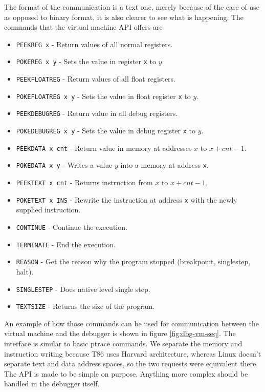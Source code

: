 The format of the communication is a text one, merely because of the ease
of use as opposed to binary format, it is also clearer to see what is
happening. The commands that the virtual machine API offers are
\begin{itemize}
    \item \texttt{PEEKREG x} - Return values of all normal registers.
    \item \texttt{POKEREG x y} - Sets the value in register \texttt{x} to
        $y$.
    \item \texttt{PEEKFLOATREG} - Return values of all float registers.
    \item \texttt{POKEFLOATREG x y} - Sets the value in float register
        \texttt{x} to $y$.
    \item \texttt{PEEKDEBUGREG} - Return value in all debug registers.
    \item \texttt{POKEDEBUGREG x y} - Sets the value in debug register
        \texttt{x} to $y$.
    \item \texttt{PEEKDATA x cnt} - Return value in memory at addresses $x$ to $x + cnt - 1$.
    \item \texttt{POKEDATA x y} - Writes a value $y$ into a memory at
        address \texttt{x}.
    \item \texttt{PEEKTEXT x cnt} - Returns instruction from $x$ to $x + cnt - 1$.
    \item \texttt{POKETEXT x INS} - Rewrite the instruction at address
        \texttt{x} with the newly supplied instruction.
    \item \texttt{CONTINUE} - Continue the execution.
    \item \texttt{TERMINATE} - End the execution.
    \item \texttt{REASON} - Get the reason why the program stopped (breakpoint,
        singlestep, halt).
    \item \texttt{SINGLESTEP} - Does native level single step.
    \item \texttt{TEXTSIZE} - Returns the size of the program.
\end{itemize}
An example of how those commands can be used for communication between the
virtual machine and the debugger is shown in figure \ref{fig:dbg-vm-seq}. The
interface is similar to basic ptrace commands. We separate the memory and
instruction writing because T86 uses Harvard architecture, whereas Linux
doesn't separate text and data address spaces\cite{ptrace}, so the two requests
were equivalent there. The API is made to be simple on purpose. Anything more
complex should be handled in the debugger itself.

